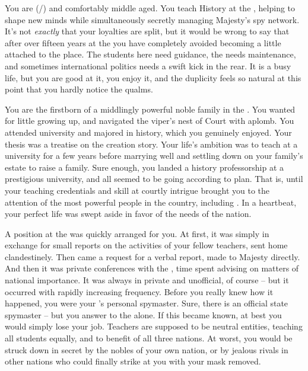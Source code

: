 \documentclass[char]{GL2020}
\begin{document}
\name{\cHistory{}}

You are \cHistory{\full} (\cHistory{\they}/\cHistory{\them}) and comfortably middle aged. You teach History at the \pSchool{}, helping to shape new minds while simultaneously secretly managing \cQueen{\Their} Majesty's spy network. It's not \emph{exactly} that your loyalties are split, but it would be wrong to say that after over fifteen years at the \pSchool{} you have completely avoided becoming a little attached to the place. The students here need guidance, the \pSc{} needs maintenance, and sometimes international politics needs a swift kick in the rear. It is a busy life, but you are good at it, you enjoy it, and the duplicity feels so natural at this point that you hardly notice the qualms.

You are the firstborn \cHistory{\child} of a middlingly powerful noble family in the \pFarm{}. You wanted for little growing up, and navigated the viper's nest of Court with aplomb. You attended university and majored in history, which you genuinely enjoyed. Your thesis was a treatise on the creation story. Your life's ambition was to teach at a \pFarm{} university for a few years before marrying well and settling down on your family's estate to raise a family. Sure enough, you landed a history professorship at a prestigious university, and all seemed to be going according to plan. That is, until your teaching credentials and skill at courtly intrigue brought you to the attention of the most powerful people in the country, including \cQueen{\full} \cQueen{\themself}. In a heartbeat, your perfect life was swept aside in favor of the needs of the nation.

A position at the \pSchool{} was quickly arranged for you. At first, it was simply in exchange for small reports on the activities of your fellow teachers, sent home clandestinely. Then came a request for a verbal report, made to \cQueen{\Their} Majesty directly. And then it was private conferences with the \cQueen{\Majesty}, time spent advising \cQueen{\them} on matters of national importance. It was always in private and unofficial, of course -- but it occurred with rapidly increasing frequency. Before you really knew how it happened, you were your \cQueen{\Majesty}'s personal spymaster. Sure, there is an official state spymaster -- but you answer to the \cQueen{\Majesty} alone. If this became known, at best you would simply lose your job. Teachers are supposed to be neutral entities, teaching all students equally, and to benefit of all three nations. At worst, you would be struck down in secret by the nobles of your own nation, or by jealous rivals in other nations who could finally strike at you with your mask removed. 
\end{document}
